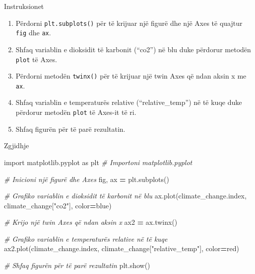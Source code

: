 \documentclass[
  ignorenonframetext,
]{beamer}
\newenvironment{Shaded}{\begin{snugshade}}{\end{snugshade}}
\newcommand{\CommentTok}[1]{\textcolor[rgb]{0.56,0.35,0.01}{\textit{#1}}}
\newcommand{\ImportTok}[1]{#1}
\newcommand{\NormalTok}[1]{#1}
\newcommand{\OperatorTok}[1]{\textcolor[rgb]{0.81,0.36,0.00}{\textbf{#1}}}
\newcommand{\StringTok}[1]{\textcolor[rgb]{0.31,0.60,0.02}{#1}}
\begin{document}
\begin{frame}[fragile]{Instruksionet}
\protect\hypertarget{instruksionet-7}{}
\begin{enumerate}
\item
  Përdorni \texttt{plt.subplots()} për të krijuar një figurë dhe një
  Axes të quajtur \texttt{fig} dhe \texttt{ax}.
\item
  Shfaq variablin e dioksidit të karbonit (``co2'') në blu duke përdorur
  metodën \texttt{plot} të Axes.
\item
  Përdorni metodën \texttt{twinx()} për të krijuar një twin Axes që ndan
  aksin x me \texttt{ax}.
\item
  Shfaq variablin e temperaturës relative (``relative\_temp'') në të
  kuqe duke përdorur metodën \texttt{plot} të Axes-it të ri.
\item
  Shfaq figurën për të parë rezultatin.
\end{enumerate}
\end{frame}

\begin{frame}[fragile]{Zgjidhje}
\protect\hypertarget{zgjidhje-7}{}

\begin{Shaded}
\begin{Highlighting}[]
\ImportTok{import}\NormalTok{ matplotlib.pyplot }\ImportTok{as}\NormalTok{ plt  }\CommentTok{\# Importoni matplotlib.pyplot}

\CommentTok{\# Inicioni një figurë dhe Axes}
\NormalTok{fig, ax }\OperatorTok{=}\NormalTok{ plt.subplots()}

\CommentTok{\# Grafiko variablin e dioksidit të karbonit në blu}
\NormalTok{ax.plot(climate\_change.index, climate\_change[}\StringTok{"co2"}\NormalTok{], color}\OperatorTok{=}\StringTok{\textquotesingle{}blue\textquotesingle{}}\NormalTok{)}

\CommentTok{\# Krijo një twin Axes që ndan aksin x}
\NormalTok{ax2 }\OperatorTok{=}\NormalTok{ ax.twinx()}

\CommentTok{\# Grafiko variablin e temperaturës relative në të kuqe}
\NormalTok{ax2.plot(climate\_change.index, climate\_change[}\StringTok{"relative\_temp"}\NormalTok{], color}\OperatorTok{=}\StringTok{\textquotesingle{}red\textquotesingle{}}\NormalTok{)}

\CommentTok{\# Shfaq figurën për të parë rezultatin}
\NormalTok{plt.show()}
\end{Highlighting}
\end{Shaded}
\end{frame}
\end{document}
